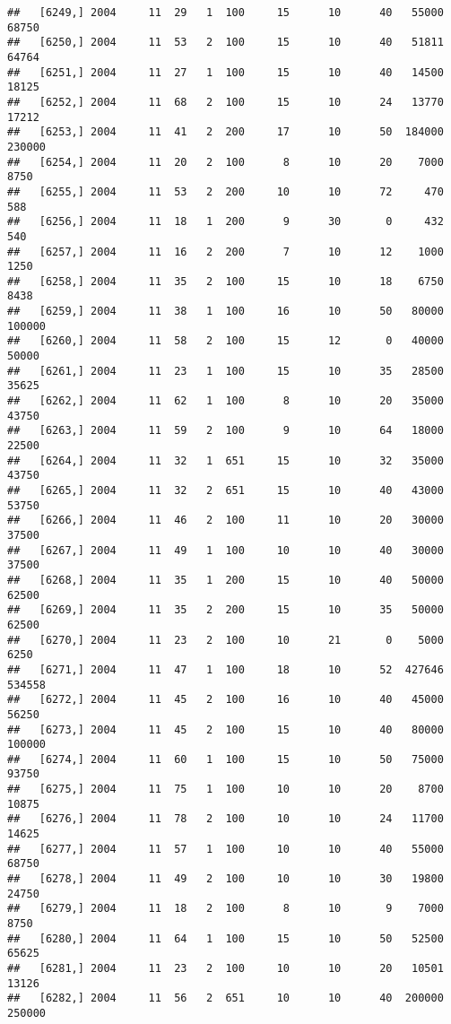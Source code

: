 \documentclass{article}\usepackage[]{graphicx}\usepackage[]{color}
\makeatletter
\newenvironment{kframe}{%
 \def\at@end@of@kframe{}%
 \ifinner\ifhmode%
  \def\at@end@of@kframe{\end{minipage}}%
  \begin{minipage}{\columnwidth}%
 \fi\fi%
 \def\FrameCommand##1{\hskip\@totalleftmargin \hskip-\fboxsep
 \colorbox{shadecolor}{##1}\hskip-\fboxsep
     \hskip-\linewidth \hskip-\@totalleftmargin \hskip\columnwidth}%
 \MakeFramed {\advance\hsize-\width
   \@totalleftmargin\z@ \linewidth\hsize
   \@setminipage}}%
 {\par\unskip\endMakeFramed%
 \at@end@of@kframe}
\newenvironment{knitrout}{}{} %
\makeatother
\begin{document}
\begin{knitrout}
\begin{kframe}
\begin{verbatim}
##   [6249,] 2004     11  29   1  100     15      10      40   55000   68750
##   [6250,] 2004     11  53   2  100     15      10      40   51811   64764
##   [6251,] 2004     11  27   1  100     15      10      40   14500   18125
##   [6252,] 2004     11  68   2  100     15      10      24   13770   17212
##   [6253,] 2004     11  41   2  200     17      10      50  184000  230000
##   [6254,] 2004     11  20   2  100      8      10      20    7000    8750
##   [6255,] 2004     11  53   2  200     10      10      72     470     588
##   [6256,] 2004     11  18   1  200      9      30       0     432     540
##   [6257,] 2004     11  16   2  200      7      10      12    1000    1250
##   [6258,] 2004     11  35   2  100     15      10      18    6750    8438
##   [6259,] 2004     11  38   1  100     16      10      50   80000  100000
##   [6260,] 2004     11  58   2  100     15      12       0   40000   50000
##   [6261,] 2004     11  23   1  100     15      10      35   28500   35625
##   [6262,] 2004     11  62   1  100      8      10      20   35000   43750
##   [6263,] 2004     11  59   2  100      9      10      64   18000   22500
##   [6264,] 2004     11  32   1  651     15      10      32   35000   43750
##   [6265,] 2004     11  32   2  651     15      10      40   43000   53750
##   [6266,] 2004     11  46   2  100     11      10      20   30000   37500
##   [6267,] 2004     11  49   1  100     10      10      40   30000   37500
##   [6268,] 2004     11  35   1  200     15      10      40   50000   62500
##   [6269,] 2004     11  35   2  200     15      10      35   50000   62500
##   [6270,] 2004     11  23   2  100     10      21       0    5000    6250
##   [6271,] 2004     11  47   1  100     18      10      52  427646  534558
##   [6272,] 2004     11  45   2  100     16      10      40   45000   56250
##   [6273,] 2004     11  45   2  100     15      10      40   80000  100000
##   [6274,] 2004     11  60   1  100     15      10      50   75000   93750
##   [6275,] 2004     11  75   1  100     10      10      20    8700   10875
##   [6276,] 2004     11  78   2  100     10      10      24   11700   14625
##   [6277,] 2004     11  57   1  100     10      10      40   55000   68750
##   [6278,] 2004     11  49   2  100     10      10      30   19800   24750
##   [6279,] 2004     11  18   2  100      8      10       9    7000    8750
##   [6280,] 2004     11  64   1  100     15      10      50   52500   65625
##   [6281,] 2004     11  23   2  100     10      10      20   10501   13126
##   [6282,] 2004     11  56   2  651     10      10      40  200000  250000

\end{verbatim}
\end{kframe}
\end{knitrout}
\end{document}
